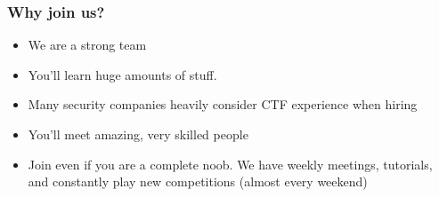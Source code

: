 \documentclass[aspectratio=169]{beamer}
\begin{document}


\begin{frame}
	\frametitle{Why join us?}
	\begin{itemize}
		\item We are a strong team
		\item You'll learn huge amounts of stuff.
		\item Many security companies heavily consider CTF experience when hiring
		\item You'll meet amazing, very skilled people
		\item Join even if you are a complete noob. We have weekly meetings, tutorials, and constantly play new competitions (almost every weekend)
	\end{itemize}
\end{frame}

\end{document}

